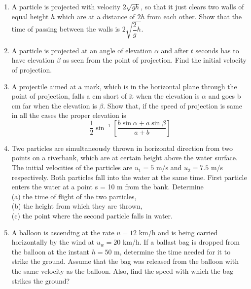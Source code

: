 \documentclass{article}
\renewcommand{\frac}[2]{\dfrac{#1}{#2}}
\begin{document}
\begin{enumerate}
    \item A particle is projected with velocity $2\sqrt{gh}$, so that it just clears two walls of equal height $h$ which are at a distance of $2h$ from each other. Show that the time of passing between the walls is $2\sqrt{\frac{2}{g}h}$.
    
    \item A particle is projected at an angle of elevation $\alpha$ and after $t$ seconds has to have elevation $\beta$ as seen from the point of projection. Find the initial velocity of projection.

    \item A projectile aimed at a mark, which is in the horizontal plane through the point of projection, falls a cm short of it when the elevation is $\alpha$ and goes b cm far when the elevation is $\beta$. Show that, if the speed of projection is same in all the cases the proper elevation is \\
    \[\frac{1}{2} \sin^{-1}\left[\frac{b \sin \alpha + a \sin \beta}{a + b}\right]\]

    \item Two particles are simultaneously thrown in horizontal direction from two points on a riverbank, which are at certain height above the water surface. The initial velocities of the particles are $u_1 = 5$ m/s and $u_2 = 7.5$ m/s respectively. Both particles fall into the water at the same time. First particle enters the water at a point s = 10 m from the bank. Determine \\
    (a) the time of flight of the two particles, \\
    (b) the height from which they are thrown, \\
    (c) the point where the second particle falls in water.
    \item A balloon is ascending at the rate $u = 12$ km/h and is being carried horizontally by the wind at $u_w = 20$ km/h. If a ballast bag is dropped from the balloon at the instant $h = 50$ m, determine the time needed for it to strike the ground. Assume that the bag was released from the balloon with the same velocity as the balloon. Also, find the speed with which the bag strikes the ground?


\end{enumerate}
\end{document}

